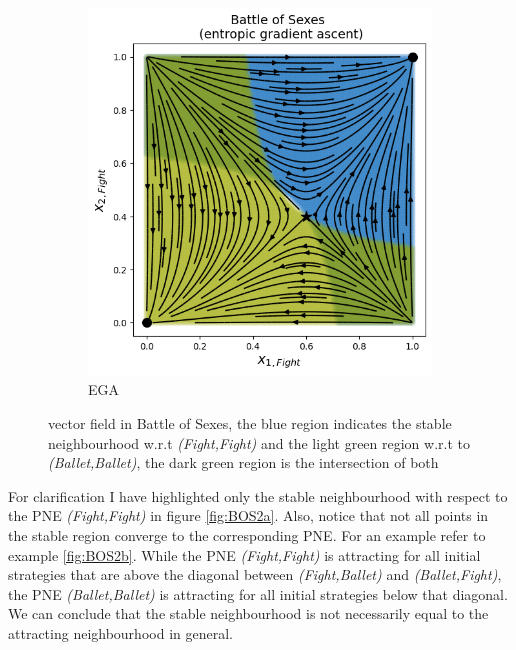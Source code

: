 \begin{figure}[H]
\begin{subfigure}{.5\textwidth}
    \includegraphics[width=\textwidth]{logos/BattleOfSexes2.png}
    \caption{EGA}
\end{subfigure}
\caption{vector field in Battle of Sexes,
the blue region indicates the stable neighbourhood w.r.t \textit{(Fight,Fight)} and the light green region w.r.t to \textit{(Ballet,Ballet)}, the dark green region is the intersection of both}
\label{fig:BOS1}
\end{figure}

For clarification I have highlighted only the stable neighbourhood with respect to the PNE \textit{(Fight,Fight)} in figure \ref{fig:BOS2a}. Also, notice that not all points in the stable region converge to the corresponding PNE. For an example refer to example \ref{fig:BOS2b}. While the PNE \textit{(Fight,Fight)} is attracting for all initial strategies that are above the diagonal between \textit{(Fight,Ballet)} and \textit{(Ballet,Fight)}, the PNE \textit{(Ballet,Ballet)} is attracting for all initial strategies below that diagonal. We can conclude that the stable neighbourhood is not necessarily equal to the attracting neighbourhood in general. \\

